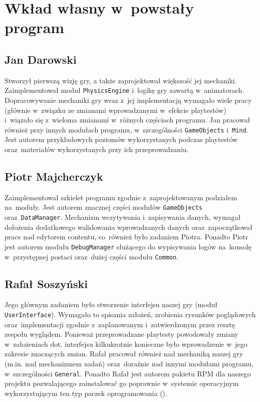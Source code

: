 \documentclass[licencjacka]{pracamgr}
\begin{document}
\chapter{Wkład własny w~powstały program}

  \section{Jan Darowski}
    Stworzył pierwszą wizję gry, a także zaprojektował większość jej mechaniki. Zaimplementował moduł \texttt{PhysicsEngine}
    i~logikę gry zawartą w~animatorach. Dopracowywanie mechaniki gry wraz z~jej implementacją wymagało wiele pracy (głównie w~związku
    ze zmianami wprowadzanymi w~efekcie playtestów) i~wiązało się z~wieloma zmianami w~różnych częściach programu. 
    Jan pracował również przy innych modułach programu, w~szczególności \texttt{GameObjects} i~\texttt{Mind}. 
    Jest autorem przykładowych poziomów wykorzystanych podczas playtestów oraz~materiałów wykorzystanych przy ich przeprowadzaniu.

  \section{Piotr Majcherczyk}
    Zaimplementował szkielet programu zgodnie z~zaprojektowanym podziałem na~moduły. Jest autorem znacznej części modułów \texttt{GameObjects}
    oraz~\texttt{DataManager}. Mechanizm wczytywania i~zapisywania danych, wymagał dołożenia dodatkowego walidowania wprowadzanych danych
    oraz~zapoczątkował prace nad edytorem contentu, co~również było zadaniem Piotra. Ponadto Piotr jest autorem modułu \texttt{DebugManager}
    służącego do wypisywania logów na~konsolę w~przystępnej postaci oraz~dużej części modułu \texttt{Common}.

  \section{Rafał Soszyński}
    Jego głównym zadaniem było stworzenie interfejsu naszej gry (moduł \texttt{UserInterface}). Wymagało to spisania założeń, zrobienia 
    rysunków poglądowych oraz~implementacji zgodnie z~zaplanowanym i~zatwierdzonym przez resztę zespołu wyglądem. Ponieważ przeprowadzane
    playtesty powodowały zmiany w~założeniach dot. interfejsu kilkukrotnie konieczne było wprowadzenie w~jego zakresie znaczących zmian.
    Rafał pracował również nad mechaniką naszej gry (m.in. nad mechanizmem zadań) oraz~doraźnie nad innymi modułami programu, w~szczególności
    \texttt{General}. Ponadto Rafał jest autorem pakietu RPM dla naszego projektu pozwalającego zainstalować go poprawnie w~systemie operacyjnym
    wykorzystującym ten typ paczek oprogramowania ().
\end{document}
